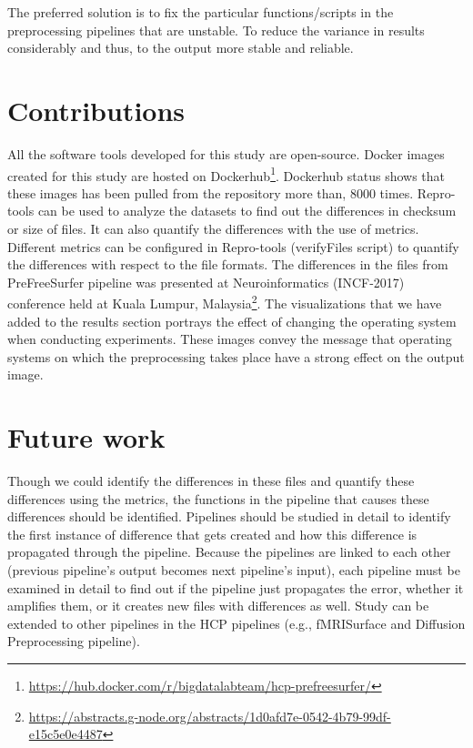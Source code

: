 The preferred solution is to fix the particular functions/scripts in 
the preprocessing pipelines that are unstable. To reduce the 
variance in results considerably and thus, to the output 
more stable and reliable.

\section{Contributions}
All the software tools developed for this study are open-source.
 Docker images created for this study are hosted on 
 Dockerhub\footnote{\url{https://hub.docker.com/r/bigdatalabteam/hcp-prefreesurfer/}}. 
 Dockerhub status shows that these images has been pulled from the 
 repository more than, 8000 times. Repro-tools can be used to analyze 
 the datasets to find out the differences in checksum or size 
 of files. It can also quantify the differences with the use of 
 metrics. Different metrics can be configured in Repro-tools 
 (verifyFiles script) to quantify the differences with respect to the 
 file formats. The differences in the files from PreFreeSurfer pipeline was presented at Neuroinformatics (INCF-2017) conference held at Kuala Lumpur, Malaysia\footnote{\url{https://abstracts.g-node.org/abstracts/1d0afd7e-0542-4b79-99df-e15c5e0e4487}}. The visualizations that we have added to the results section 
 portrays the effect of changing the operating system when
 conducting experiments. These images convey the message 
 that operating systems on which the preprocessing takes place have a 
 strong effect on the output image.

\section{Future work}
Though we could identify the differences in these files and quantify these differences using the metrics, the functions in the pipeline that causes these differences should be identified.
Pipelines should be studied in detail to identify the first instance of difference that gets created and how this difference is propagated through the pipeline.
Because the pipelines are linked to each other (previous pipeline's output becomes next pipeline's input), each pipeline must be examined in detail to find out if the pipeline just propagates the error, whether it amplifies them, or it creates new files with differences as well. 
Study can be extended to other pipelines in the HCP pipelines (e.g., fMRISurface and Diffusion Preprocessing pipeline).
